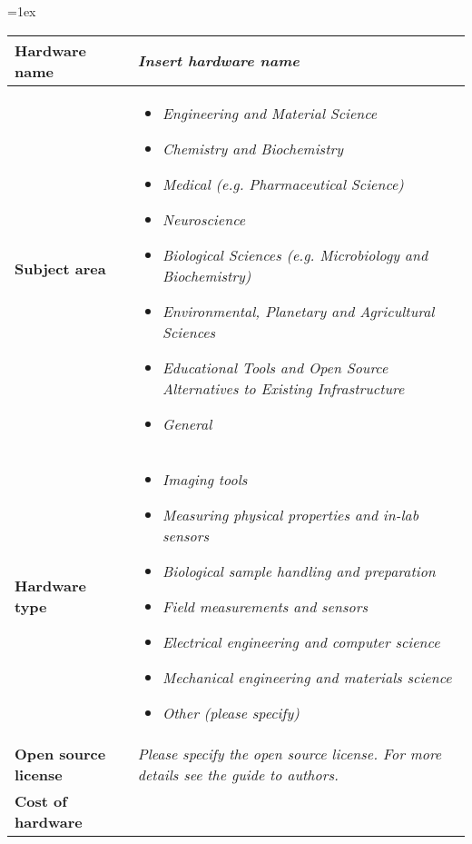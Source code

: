 \documentclass[11pt, letterpaper]{article}
\begin{document}
\begin{flushleft}
\tabulinesep=1ex
\begin{tabu} to \linewidth {|X|X[3,l]|}
\hline  \textbf{Hardware name} & \textit{Insert hardware name}
  \\
  \hline \textbf{Subject area} & %
  \begin{itemize}
  \item \textit{Engineering and Material Science}
  \item \textit{Chemistry and Biochemistry}
  \item \textit{Medical (e.g. Pharmaceutical Science)}
  \item \textit{Neuroscience}
  \item \textit{Biological Sciences (e.g. Microbiology and Biochemistry)}
  \item \textit{Environmental, Planetary and Agricultural Sciences}
  \item \textit{Educational Tools and Open Source Alternatives to Existing Infrastructure}
  \item \textit{General}
  \end{itemize}
  \\
  \hline \textbf{Hardware type} &
  \begin{itemize}
  \item \textit{Imaging tools}
  \item \textit{Measuring physical properties and in-lab sensors}
  \item \textit{Biological sample handling and preparation}
  \item \textit{Field measurements and sensors}
  \item \textit{Electrical engineering and computer science}
  \item \textit{Mechanical engineering and materials science}
  \item \textit{Other (please specify)}
  \end{itemize}
  \\ 
\hline \textbf{Open source license} &
  \textit{Please specify the open source license. For more details see the guide to authors.}
  \\
\hline \textbf{Cost of hardware} &

\end{tabu}
\end{flushleft}
\end{document}
